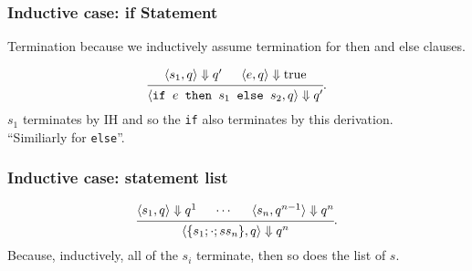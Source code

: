 \documentclass{beamer}
\newenvironment{changemargin}[1]{%
  \begin{list}{}{%
    \setlength{\topsep}{0pt}%
    \setlength{\leftmargin}{#1}%
    \setlength{\rightmargin}{1em}
    \setlength{\listparindent}{\parindent}%
    \setlength{\itemindent}{\parindent}%
    \setlength{\parsep}{\parskip}%
  }%
  \item[]}{\end{list}}
\begin{document}
\begin{frame}
  \frametitle{Inductive case: if Statement}
  
  \Large
  \begin{changemargin}{2em}
Termination because we inductively assume termination for then and else clauses.

\[
  \begin{prooftree}
    \hypo{\langle s_1, q \rangle \Downarrow q'}
    \hypo{\langle e, q \rangle \Downarrow \mbox{true}}
  \infer2{\langle \texttt{if $e$ then $s_1$ else $s_2$}, q \rangle \Downarrow q'}
  \end{prooftree}
  .
  \]
  $s_1$ terminates by IH
  and so the \texttt{if} also terminates by this derivation.\\[1em]
    ``Similiarly for \texttt{else}''.


  \end{changemargin}
\end{frame}

\begin{frame}
  \frametitle{Inductive case: statement list}
  
  \Large
  \begin{changemargin}{2em}
\[
  \begin{prooftree}
    \hypo{\langle s_1, q \rangle \Downarrow q^1}
    \hypo{\cdots}
    \hypo{\langle s_n, q^{n-1} \rangle \Downarrow q^n}
  \infer3{\langle \{ s_1 ; \cdot ;s s_n \}, q \rangle \Downarrow q^n}
  \end{prooftree}
  .
  \]
Because, inductively, all of the $s_i$ terminate, then so does the list of $s$. ~~\qedsymbol
  \end{changemargin}
\end{frame}

  
\end{document}
